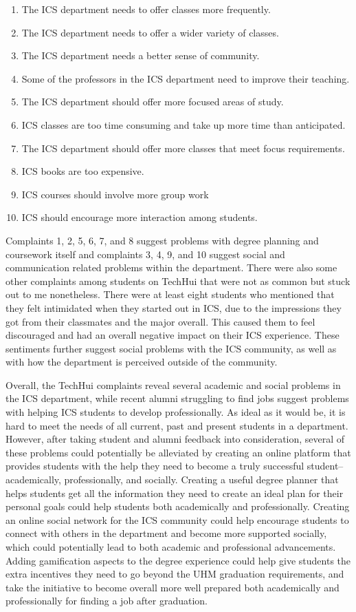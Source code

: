 \begin{enumerate}
  \item The ICS department needs to offer classes more frequently.
  \item The ICS department needs to offer a wider variety of classes.
  \item The ICS department needs a better sense of community.
  \item Some of the professors in the ICS department need to improve their teaching.
  \item The ICS department should offer more focused areas of study.
  \item ICS classes are too time consuming and take up more time than anticipated.
  \item The ICS department should offer more classes that meet focus requirements.
  \item ICS books are too expensive.
  \item ICS courses should involve more group work 
  \item ICS should encourage more interaction among students.
\end{enumerate}

Complaints 1, 2, 5, 6, 7, and 8 suggest problems with degree planning and coursework itself and complaints 3, 4, 9, and 10 suggest social and communication related problems within the department. There were also some other complaints among students on TechHui that were not as common but stuck out to me nonetheless. There were at least eight students who mentioned that they felt intimidated when they started out in ICS, due to the impressions they got from their classmates and the major overall. This caused them to feel discouraged and had an overall negative impact on their ICS experience. These sentiments further suggest social problems with the ICS community, as well as with how the department is perceived outside of the community. 

Overall, the TechHui complaints reveal several academic and social problems in the ICS department, while recent alumni struggling to find jobs suggest problems with helping ICS students to develop professionally. As ideal as it would be, it is hard to meet the needs of all current, past and present students in a department. However, after taking student and alumni feedback into consideration, several of these problems could potentially be alleviated by creating an online platform that provides students with the help they need to become a truly successful student--academically, professionally, and socially. Creating a useful degree planner that helps students get all the information they need to create an ideal plan for their personal goals could help students both academically and professionally. Creating an online social network for the ICS community could help encourage students to connect with others in the department and become more supported socially, which could potentially lead to both academic and professional advancements. Adding gamification aspects to the degree experience could help give students the extra incentives they need to go beyond the UHM graduation requirements, and take the initiative to become overall more well prepared both academically and professionally for finding a job after graduation. 


